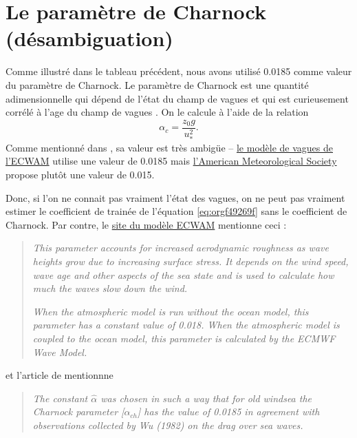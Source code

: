 \documentclass[10pt]{report}
\numberwithin{equation}{section}
\begin{document}
\section{Le paramètre de Charnock (désambiguation)}
\label{sec:orgf825c0e}
Comme illustré dans le tableau précédent, nous avons utilisé 0.0185 comme valeur du paramètre de Charnock.
Le paramètre de Charnock est une quantité adimensionnelle qui dépend de l'état du champ de vagues et qui est curieusement corrélé à l'age du champ de vagues \autocite[p.60]{janssen2004interaction}.
On le calcule à l'aide de la relation
\begin{equation}
   \alpha_c = \frac{z_0 g}{u_*^2}.
\end{equation}
Comme mentionné dans \Textcite{janssen2004interaction}, sa valeur est très ambigüe -- \href{https://codes.ecmwf.int/grib/param-db/148}{le modèle de vagues de l'ECWAM} utilise une valeur de 0.0185 mais \href{https://glossary.ametsoc.org/wiki/Charnock\%27s\_relation\#:\~:text=An\%20empirical\%20expression\%20for\%20aerodynamic,due\%20to\%20increasing\%20surface\%20stress.}{l'American Meteorological Society} propose plutôt une valeur de 0.015.\bigskip

Donc, si l'on ne connait pas vraiment l'état des vagues, on ne peut pas vraiment estimer le coefficient de trainée de l'équation \ref{eq:orgf49269f} sans le coefficient de Charnock.
Par contre, le \href{https://codes.ecmwf.int/grib/param-db/148}{site du modèle ECWAM} mentionne ceci :

\begin{quote}
\emph{This parameter accounts for increased aerodynamic roughness as wave heights grow due to increasing surface stress. It depends on the wind speed, wave age and other aspects of the sea state and is used to calculate how much the waves slow down the wind.}

\emph{When the atmospheric model is run without the ocean model, this parameter has a constant value of 0.018. When the atmospheric model is coupled to the ocean model, this parameter is calculated by the ECMWF Wave Model.}
\end{quote}

et l'article de \Textcite[p.163]{janssen2004interaction} mentionnne

\begin{quote}
\emph{The constant \(\hat{\alpha}\) was chosen in such a way
that for old windsea the Charnock parameter [\(\alpha_{ch}\)] has the value of 0.0185 in
agreement with observations collected by Wu (1982) on the drag over sea
waves.}
\end{quote}
\end{document}
